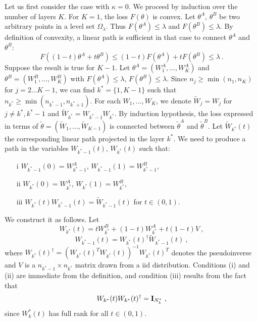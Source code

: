 Let us first consider the case with $\kappa =0$.
We proceed by induction over the number of layers $K$. 
For $K=1$, the loss $F(\theta)$ is convex. Let  $\theta^A$, $\theta^B$ be two arbitrary points 
in a level set $\Omega_\lambda$. Thus $F(\theta^A) \leq \lambda$ and $F(\theta^B) \leq \lambda$. By definition
of convexity, a linear path is sufficient in that case to connect $\theta^A$ and $\theta^B$:
$$F( (1-t) \theta^A + t \theta^B) \leq (1-t) F(\theta^A) + t F(\theta^B) \leq \lambda~.$$
Suppose the result is true for $K-1$. Let $\theta^A = (W_1^A, \dots, W^A_K)$ and 
 $\theta^B = (W_1^B, \dots, W^B_K)$ with $F(\theta^A) \leq \lambda$, $F(\theta^B) \leq \lambda$.
 Since $n_j \geq \min(n_1, n_K)$ for $j=2 \dots K-1$, we can find $k^*=\{1, K-1\}$ such that
 $n_{k^*} \geq \min(n_{k^*-1}, n_{k^*+1})$.
For each $W_1, \dots, W_K$, we denote $\tilde{W}_j = W_j$ for $j \neq k^*, k^*- 1$ and
$\tilde{W}_{k^*} = W_{k^*-1} W_{k^*}$. 
By induction hypothesis, the 
loss expressed in terms of $\tilde{\theta} = (\tilde{W}_1, \dots, \tilde{W}_{K-1})$ is connected 
between $\tilde{\theta}^A$ and $\tilde{\theta}^B$. Let $\tilde{W}_{k^*}(t)$ the corresponding 
linear path projected in the  layer $k^*$. 
We need to produce a path in the variables $W_{k^*-1}(t)$, $W_{k^*}(t)$ 
such that:
\begin{itemize}
\item[i] $W_{k^*-1}(0) = W_{k^*-1}^A$, $W_{k^*-1}(1) = W_{k^*-1}^B$, 
\item[ii] $W_{k^*}(0) = W_{k^*}^A$, $W_{k^*}(1) = W_{k^*}^B$,
\item[iii] $W_{k^*}(t) W_{k^*-1}(t) = \tilde{W}_{k^*-1}(t) $ for $t \in (0,1)$. 
\end{itemize} 
We construct it as follows. Let 
$$W_{k^*}(t) = t W_{k^*}^B + (1-t) W_{k^*}^A + t (1-t) V~,$$
$$W_{k^*-1}(t) = W_{k^*}(t)^\dagger \tilde{W}_{k^*-1}(t)  ~,$$
where $W_{k^*}(t)^\dagger = ( W_{k^*}(t)^T W_{k^*}(t))^{-1} W_{k^*}(t)^T$ denotes the pseudoinverse 
and $V$ is a $n_{k^*-1} \times n_{k^*}$ matrix drawn from a iid distribution. 
Conditions (i) and (ii) are immediate from the definition, and condition (iii) results from the fact that 
$$W_{k^*}(t) W_{k^*}(t)^\dagger  = {\bf I}_{N_k^*}~,$$
since $W_k^*(t)$ has full rank for all $t \in (0,1)$. 


